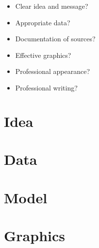 \documentclass[11pt]{article}
\begin{document}
\begin{itemize} %
      \item Clear idea and message?
      \item Appropriate data?
      \item Documentation of sources?
      \item Effective graphics?
      \item Professional appearance?
      \item Professional writing?
\end{itemize}
\bigskip

\section*{Idea}

\vspace*{0.3in}



\section*{Data}

\vspace*{0.3in}


\section*{Model}

\vspace*{0.3in}


\section*{Graphics}

\vspace*{0.3in}

\end{document}
